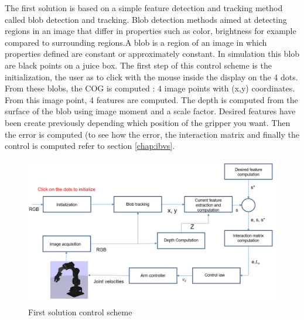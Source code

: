 The first solution is based on a simple feature detection and tracking method called blob detection and tracking. Blob detection methods aimed at detecting regions in an image that differ in properties such as color, brightness for example compared to surrounding regions.A blob is a region of an image in which properties defined are constant or approximately constant. In simulation this blob are black points on a juice box.
The first step of this control scheme is the initialization, the user as to click with the mouse inside the display on the 4 dots. From these blobs, the \gls{COG} is computed : 4 image points with (x,y) coordinates.
From this image point, 4 features are computed. The depth is computed from the surface of the blob using image moment and a scale factor.
Desired features have been create previously depending which position of the gripper you want. Then the error is computed (to see how the error, the interaction matrix and finally the control is computed refer to section \ref{chap:ibvs}.
\begin{figure} [!h]
    \centering
    \includegraphics[width=0.95\linewidth]{images/control_scheme_1.png}
    \caption{First solution control scheme}
    \label{pict:control_scheme_1}
\end{figure}

